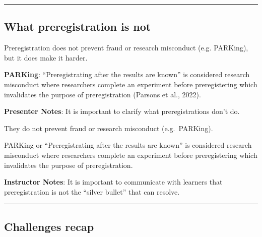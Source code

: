 \documentclass[
  letterpaper,
  DIV=11,
  numbers=noendperiod]{scrartcl}
\begin{document}
\begin{center}\rule{0.5\linewidth}{0.5pt}\end{center}

\subsection{What preregistration is
not}\label{what-preregistration-is-not}

Preregistration does not prevent fraud or research misconduct (e.g.
PARKing), but it does make it harder.

\begin{tcolorbox}[enhanced jigsaw, arc=.35mm, bottomrule=.15mm, bottomtitle=1mm, breakable, colback=white, colbacktitle=quarto-callout-note-color!10!white, colframe=quarto-callout-note-color-frame, coltitle=black, left=2mm, leftrule=.75mm, opacityback=0, opacitybacktitle=0.6, rightrule=.15mm, title=\textcolor{quarto-callout-note-color}{\faInfo}\hspace{0.5em}{Definition}, titlerule=0mm, toprule=.15mm, toptitle=1mm]

\textbf{PARKing}: ``Preregistrating after the results are known'' is
considered research misconduct where researchers complete an experiment
before preregistering which invalidates the purpose of preregistration
(Parsons et al., 2022).

\end{tcolorbox}

\textbf{Presenter Notes}: It is important to clarify what
preregistrations don't do.

They do not prevent fraud or research misconduct (e.g.~PARKing).

PARKing or ``Preregistrating after the results are known'' is considered
research misconduct where researchers complete an experiment before
preregistering which invalidates the purpose of preregistration.

\textbf{Instructor Notes}: It is important to communicate with learners
that preregistration is not the ``silver bullet'' that can resolve.

\begin{center}\rule{0.5\linewidth}{0.5pt}\end{center}

\subsection{Challenges recap}\label{challenges-recap}
\end{document}
